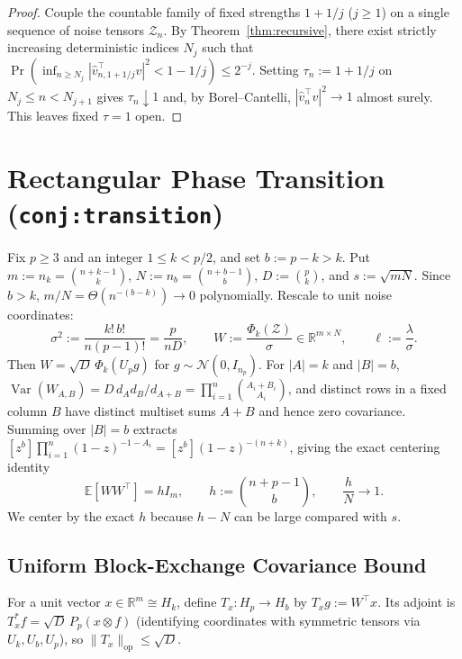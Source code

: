 \documentclass[11pt]{article}
\theoremstyle{plain}
\theoremstyle{definition}
\theoremstyle{remark}
\DeclareMathOperator{\Var}{Var}
\begin{document}
\begin{proof}
Couple the countable family of fixed strengths $1 + 1/j$ ($j \ge 1$) on a single sequence of noise tensors $\mathcal{Z}_n$. By Theorem~\ref{thm:recursive}, there exist strictly increasing deterministic indices $N_j$ such that $\Pr(\inf_{n \ge N_j} |\hat v_{n,1+1/j}^\top v|^2 < 1 - 1/j) \le 2^{-j}$. Setting $\tau_n := 1 + 1/j$ on $N_j \le n < N_{j+1}$ gives $\tau_n \downarrow 1$ and, by Borel--Cantelli, $|\hat v_n^\top v|^2 \to 1$ almost surely. This leaves fixed $\tau = 1$ open.
\end{proof}

\section{Rectangular Phase Transition (\texttt{conj:transition})}

Fix $p \ge 3$ and an integer $1 \le k < p/2$, and set $b := p - k > k$. Put $m := n_k = \binom{n+k-1}{k}$, $N := n_b = \binom{n+b-1}{b}$, $D := \binom{p}{k}$, and $s := \sqrt{mN}$. Since $b > k$, $m/N = \Theta(n^{-(b-k)}) \to 0$ polynomially. Rescale to unit noise coordinates:
\[
\sigma^2 := \frac{k!\,b!}{n(p-1)!} = \frac{p}{nD}, \qquad
W := \frac{\Phi_k(\mathcal{Z})}{\sigma} \in \mathbb{R}^{m \times N}, \qquad
\ell := \frac{\lambda}{\sigma}.
\]
Then $W = \sqrt{D}\,\Phi_k(U_p g)$ for $g \sim \mathcal{N}(0, I_{n_p})$. For $|A| = k$ and $|B| = b$, $\Var(W_{A,B}) = D\, d_A d_B / d_{A+B} = \prod_{i=1}^n \binom{A_i + B_i}{A_i}$, and distinct rows in a fixed column $B$ have distinct multiset sums $A+B$ and hence zero covariance. Summing over $|B| = b$ extracts $[z^b]\prod_{i=1}^n (1-z)^{-1-A_i} = [z^b](1-z)^{-(n+k)}$, giving the exact centering identity
\begin{equation}\label{eq:exact-center}
\mathbb{E}[W W^\top] = h I_m, \qquad h := \binom{n+p-1}{b}, \qquad \frac{h}{N} \longrightarrow 1.
\end{equation}
We center by the exact $h$ because $h - N$ can be large compared with $s$.

\subsection{Uniform Block-Exchange Covariance Bound}

For a unit vector $x \in \mathbb{R}^m \cong H_k$, define $T_x : H_p \to H_b$ by $T_x g := W^\top x$. Its adjoint is $T_x^* f = \sqrt{D}\,P_p(x \otimes f)$ (identifying coordinates with symmetric tensors via $U_k, U_b, U_p$), so $\|T_x\|_{\mathrm{op}} \le \sqrt{D}$.
\end{document}
